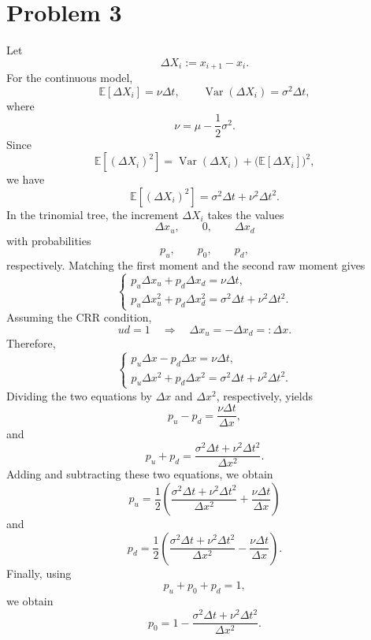\documentclass{article}
\begin{document}
\section*{Problem 3}
Let
\[
\Delta X_i:=x_{i+1}-x_i.
\]
For the continuous model,
\[
\mathbb{E}[\Delta X_i]=\nu\Delta t,
\qquad
\operatorname{Var}(\Delta X_i)=\sigma^2\Delta t,
\]
where
\[
\nu=\mu-\frac12\sigma^2.
\]
Since
\[
\mathbb{E}[(\Delta X_i)^2]
=
\operatorname{Var}(\Delta X_i)
+
\bigl(\mathbb{E}[\Delta X_i]\bigr)^2,
\]
we have
\[
\mathbb{E}[(\Delta X_i)^2]
=
\sigma^2\Delta t+\nu^2\Delta t^2.
\]
In the trinomial tree, the increment $\Delta X_i$ takes the values
\[
\Delta x_u,\qquad 0,\qquad \Delta x_d
\]
with probabilities
\[
p_u,\qquad p_0,\qquad p_d,
\]
respectively. Matching the first moment and the second raw moment gives
\[
\begin{cases}
p_u\Delta x_u+p_d\Delta x_d=\nu\Delta t,\\[4pt]
p_u\Delta x_u^2+p_d\Delta x_d^2
=\sigma^2\Delta t+\nu^2\Delta t^2.
\end{cases}
\]
Assuming the CRR condition,
\[
ud=1
\quad\Longrightarrow\quad
\Delta x_u=-\Delta x_d=:\Delta x.
\]
Therefore,
\[
\begin{cases}
p_u\Delta x-p_d\Delta x=\nu\Delta t,\\[4pt]
p_u\Delta x^2+p_d\Delta x^2
=\sigma^2\Delta t+\nu^2\Delta t^2.
\end{cases}
\]
Dividing the two equations by $\Delta x$ and $\Delta x^2$, respectively, yields
\[
p_u-p_d=\frac{\nu\Delta t}{\Delta x},
\]
and
\[
p_u+p_d
=
\frac{\sigma^2\Delta t+\nu^2\Delta t^2}{\Delta x^2}.
\]
Adding and subtracting these two equations, we obtain
\[
\boxed{
p_u
=
\frac12\left(
\frac{\sigma^2\Delta t+\nu^2\Delta t^2}{\Delta x^2}
+
\frac{\nu\Delta t}{\Delta x}
\right)
}
\]
and
\[
\boxed{
p_d
=
\frac12\left(
\frac{\sigma^2\Delta t+\nu^2\Delta t^2}{\Delta x^2}
-
\frac{\nu\Delta t}{\Delta x}
\right).
}
\]
Finally, using
\[
p_u+p_0+p_d=1,
\]
we obtain
\[
\boxed{
p_0
=
1-
\frac{\sigma^2\Delta t+\nu^2\Delta t^2}{\Delta x^2}.
}
\]
\end{document}
